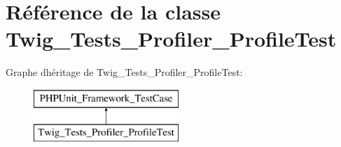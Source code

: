 \hypertarget{class_twig___tests___profiler___profile_test}{}\section{Référence de la classe Twig\+\_\+\+Tests\+\_\+\+Profiler\+\_\+\+Profile\+Test}
\label{class_twig___tests___profiler___profile_test}
Graphe d\textquotesingle{}héritage de Twig\+\_\+\+Tests\+\_\+\+Profiler\+\_\+\+Profile\+Test\+:\begin{figure}[H]
\begin{center}
\leavevmode
\includegraphics[height=2.000000cm]{class_twig___tests___profiler___profile_test}
\end{center}
\end{figure}
